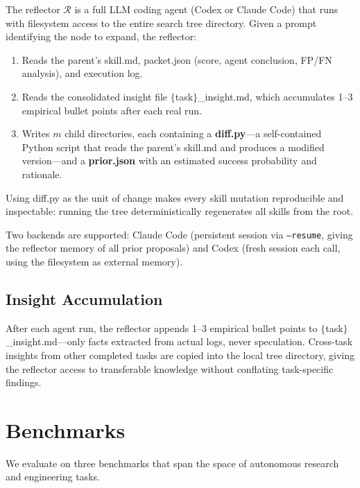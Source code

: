 \documentclass{article}
\begin{document}
The reflector $\mathcal{R}$ is a full LLM coding agent (Codex or Claude Code) that runs with filesystem access to the entire search tree directory.
Given a prompt identifying the node to expand, the reflector:
\begin{enumerate}
    \item Reads the parent's skill.md, packet.json (score, agent conclusion, FP/FN analysis), and execution log.
    \item Reads the consolidated insight file $\{$task$\}$\_insight.md, which accumulates 1--3 empirical bullet points after each real run.
    \item Writes $m$ child directories, each containing a \textbf{diff.py}---a self-contained Python script that reads the parent's skill.md and produces a modified version---and a \textbf{prior.json} with an estimated success probability and rationale.
\end{enumerate}

Using diff.py as the unit of change makes every skill mutation reproducible and inspectable: running the tree deterministically regenerates all skills from the root.

Two backends are supported: Claude Code (persistent session via \texttt{--resume}, giving the reflector memory of all prior proposals) and Codex (fresh session each call, using the filesystem as external memory).

\subsection{Insight Accumulation}

After each agent run, the reflector appends 1--3 empirical bullet points to $\{$task$\}$\_insight.md---only facts extracted from actual logs, never speculation.
Cross-task insights from other completed tasks are copied into the local tree directory, giving the reflector access to transferable knowledge without conflating task-specific findings.

\section{Benchmarks}
\label{sec:benchmarks}

We evaluate on three benchmarks that span the space of autonomous research and engineering tasks.
\end{document}
